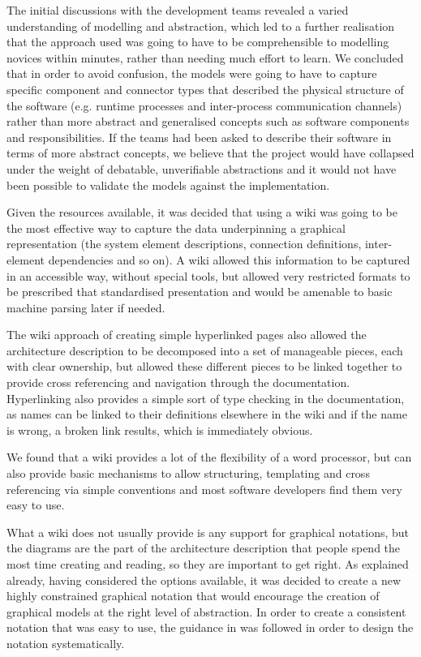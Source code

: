   The initial discussions with the development teams revealed a varied understanding of modelling and abstraction, which led to a further realisation that the approach used was going to have to be comprehensible to modelling novices within minutes, rather than needing much effort to learn.  We concluded that in order to avoid confusion, the models were going to have to capture specific component and connector types that described the physical structure of the software (e.g. runtime processes and inter-process communication channels) rather than more abstract and generalised concepts such as software components and responsibilities.  If the teams had been asked to describe their software in terms of more abstract concepts, we believe that the project would have collapsed under the weight of debatable, unverifiable abstractions and it would not have been possible to validate the models against the implementation.

  Given the resources available, it was decided that using a wiki was going to be the most effective way to capture the data underpinning a graphical representation (the system element descriptions, connection definitions, inter-element dependencies and so on).  A wiki allowed this information to be captured in an accessible way, without special tools, but allowed very restricted formats to be prescribed that standardised presentation and would be amenable to basic machine parsing later if needed.

  The wiki approach of creating simple hyperlinked pages also allowed the architecture description to be decomposed into a set of manageable pieces, each with clear ownership, but allowed these different pieces to be linked together to provide cross referencing and navigation through the documentation.  Hyperlinking also provides a simple sort of type checking in the documentation, as names can be linked to their definitions elsewhere in the wiki and if the name is wrong, a broken link results, which is immediately obvious.

  We found that a wiki provides a lot of the flexibility of a word processor, but can also provide basic mechanisms to allow structuring, templating and cross referencing via simple conventions and most software developers find them very easy to use.

  What a wiki does not usually provide is any support for graphical notations, but the diagrams are the part of the architecture description that people spend the most time creating and reading, so they are important to get right.  As explained already, having considered the options available, it was decided to create a new highly constrained graphical notation that would encourage the creation of graphical models at the right level of abstraction.  In order to create a consistent notation that was easy to use, the guidance in \cite{moody2009-notations} was followed in order to design the notation systematically.

